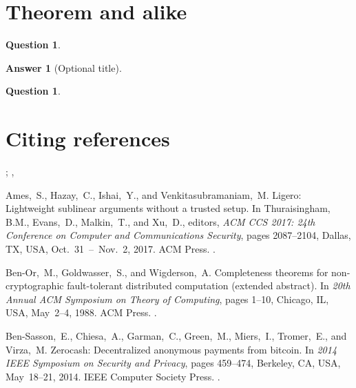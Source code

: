 \documentclass{enisareport}
\theoremstyle{plain}
\newtheorem{question}{Question}[chapter]
\newtheorem*{question*}{Question}
\theoremstyle{definition}
\newtheorem*{answer}{Answer}
\begin{document}
\section{Theorem and alike}

\begin{question}
\lipsum[1]
\end{question}

\begin{answer}[Optional title]
\lipsum[2]
\end{answer}

\begin{question*}
  \lipsum[3]
\end{question*}



\section{Citing references}

\cite{CCS:AHIV17}

\citep{STOC:BenGolWig88}; \citet{STOC:BenGolWig88}, \citet*{STOC:BenGolWig88}

\cite{CCS:AHIV17, STOC:BenGolWig88, SP:BCGGMT14}


\begin{thebibliography}{31}

Ames,~S., Hazay,~C., Ishai,~Y., and Venkitasubramaniam,~M.
\newblock Ligero: Lightweight sublinear arguments without a trusted setup.
\newblock In Thuraisingham, B.M., Evans,~D., Malkin,~T., and Xu,~D., editors,
  \emph{ACM CCS 2017: 24th Conference on Computer and Communications Security},
  pages 2087--2104, Dallas, TX, USA, Oct.~31~--~Nov.~2, 2017. {ACM} Press.
\newblock {}.


{Ben-Or},~M., Goldwasser,~S., and Wigderson,~A.
\newblock Completeness theorems for non-cryptographic fault-tolerant
  distributed computation (extended abstract).
\newblock In \emph{20th Annual {ACM} Symposium on Theory of Computing}, pages
  1--10, Chicago, IL, USA, May~2--4, 1988. {ACM} Press.
\newblock {}.

{Ben-Sasson},~E., Chiesa,~A., Garman,~C., Green,~M., Miers,~I., Tromer,~E., and
  Virza,~M.
\newblock Zerocash: Decentralized anonymous payments from bitcoin.
\newblock In \emph{2014 {IEEE} Symposium on Security and Privacy}, pages
  459--474, Berkeley, CA, USA, May~18--21, 2014. {IEEE} Computer Society Press.
\newblock {}.

\end{thebibliography}
\end{document}
